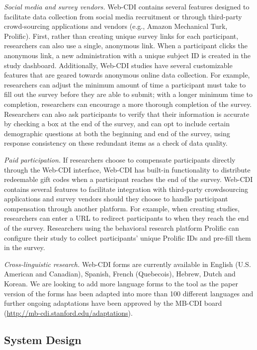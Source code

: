 \documentclass[
  english,
  ,man,floatsintext]{apa6}
\begin{document}
\emph{Social media and survey vendors.} Web-CDI contains several features designed to facilitate data collection from social media recruitment or through third-party crowd-sourcing applications and vendors (e.g., Amazon Mechanical Turk, Prolific). First, rather than creating unique survey links for each participant, researchers can also use a single, anonymous link. When a participant clicks the anonymous link, a new administration with a unique subject ID is created in the study dashboard. Additionally, Web-CDI studies have several customizable features that are geared towards anonymous online data collection. For example, researchers can adjust the minimum amount of time a participant must take to fill out the survey before they are able to submit; with a longer minimum time to completion, researchers can encourage a more thorough completion of the survey. Researchers can also ask participants to verify that their information is accurate by checking a box at the end of the survey, and can opt to include certain demographic questions at both the beginning and end of the survey, using response consistency on these redundant items as a check of data quality.

\emph{Paid participation.} If researchers choose to compensate participants directly through the Web-CDI interface, Web-CDI has built-in functionality to distribute redeemable gift codes when a participant reaches the end of the survey. Web-CDI contains several features to facilitate integration with third-party crowdsourcing applications and survey vendors should they choose to handle participant compensation through another platform. For example, when creating studies, researchers can enter a URL to redirect participants to when they reach the end of the survey. Researchers using the behavioral research platform Prolific can configure their study to collect participants' unique Prolific IDs and pre-fill them in the survey.

\emph{Cross-linguistic research.} Web-CDI forms are currently available in English (U.S. American and Canadian), Spanish, French (Quebecois), Hebrew, Dutch and Korean. We are looking to add more language forms to the tool as the paper version of the forms has been adapted into more than 100 different languages and further ongoing adaptations have been approved by the MB-CDI board (\url{http://mb-cdi.stanford.edu/adaptations}).

\hypertarget{system-design}{%
\subsection{System Design}\label{system-design}}
\end{document}

